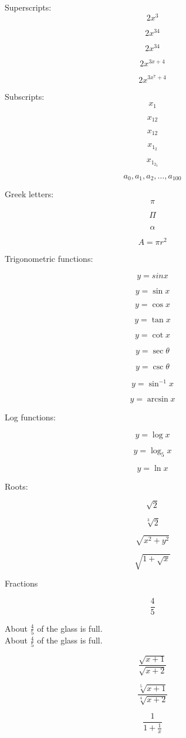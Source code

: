 \documentclass[12pt]{article}
\begin{document}
Superscripts: $$2x^3$$

$$2x^34$$

$$2x^{34}$$

$$2x^{3x+4}$$

$$2x^{3x^7+4}$$

Subscripts: $$x_1$$

$$x_12$$

$$x_{12}$$

$$x_{1_2}$$

$$x_{1_{2_3}}$$

$$a_0,a_1,a_2,\ldots,a_100 $$

Greek letters:
$$\pi$$

$$\Pi$$

$$\alpha $$

$$A=\pi r^2$$


Trigonometric functions:

$$y=sin x$$

$$y=\sin x$$

$$y=\cos x$$

$$y=\tan x$$

$$y=\cot x$$

$$y=\sec \theta$$

$$y= \csc \theta $$

$$y=\sin^{-1} x$$

$$y=\arcsin x$$

Log functions:

$$y=\log x$$

$$y=\log_5 x$$

$$y=\ln x$$

Roots:

$$\sqrt{2}$$

$$\sqrt[3]{2}$$

$$\sqrt{x^2 + y^2}$$

$$\sqrt{  1+\sqrt x  }$$

Fractions

$$\frac{4}{5}$$

About $\frac{4}{5}$ of the glass is full. \\ [6pt]

About $\displaystyle\frac{4}{5}$ of the glass is full.

$$\frac{\sqrt{x+1}}{\sqrt{x+2}}$$

$$\frac{\sqrt[5]{x+1}}{\sqrt[4]{x+2}}$$

$$\frac{1}{  1+ \frac{1}{x}  }$$
\end{document}
